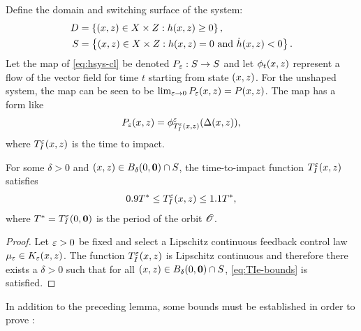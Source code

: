 \documentclass[twocolumn]{article}
\begin{document}
Define the domain and switching surface of the system:
\begin{align}
  D &= \left\{ (x, z) \in X \times Z : h(x, z) \geq 0 \right\},\\
  \nonumber
  S &= \left\{ (x, z) \in X \times Z : h(x, z) = 0 \mbox{ and } {\dot h}(x, z) < 0 \right\}.
\end{align}
Let the \Poincare{} map of \eqref{eq:hsys-cl} be denoted $P_{\varepsilon} : S \to S$ and let $\phi_{t}(x, z)$ represent a flow of the vector field for time $t$ starting from state $(x, z)$.
%
For the unshaped system, the \Poincare{} map can be seen to be $\lim_{\varepsilon \to 0} P_{\varepsilon}(x, z) = P(x, z)$.
%
The \Poincare{} map has a form like
\begin{align}
  P_{\varepsilon}(x, z) = \phi^{\varepsilon}_{T_{I}^{\varepsilon}(x, z)}(\Delta(x, z)),
\end{align}
where $T_{I}^{\varepsilon}(x, z)$ is the time to impact.

\begin{lemma}
  \label{lemma:TIe-bounds}
  For some $\delta > 0$ and $(x, z) \in B_{\delta}(0, {\mathbf 0}) \cap S$, the time-to-impact function $T_{I}^{\varepsilon}(x, z)$ satisfies
  \begin{align}
    \label{eq:TIe-bounds}
    0.9 T^{*} \leq T_{I}^{\varepsilon}(x, z) \leq 1.1 T^{*},
  \end{align}
  where $T^{*} = T_{I}^{\varepsilon}(0, {\mathbf 0})$ is the period of the orbit ${\mathscr O}$.
\end{lemma}
\begin{proof}
  Let $\varepsilon > 0$ be fixed and select a Lipschitz continuous feedback control law $\mu_{\varepsilon} \in K_{\varepsilon}(x, z)$. The function $T_{I}^{\varepsilon}(x, z)$ is Lipschitz continuous and therefore there exists a $\delta > 0$ such that for all $(x, z) \in B_{\delta}(0, {\mathbf 0}) \cap S$, \eqref{eq:TIe-bounds} is satisfied.
\end{proof}

In addition to the preceding lemma, some bounds must be established in order to prove :
\end{document}

